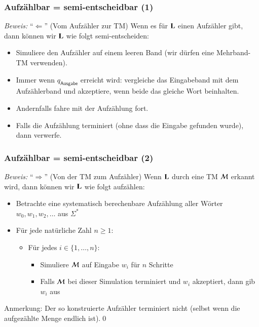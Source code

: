 \documentclass[onlymath]{beamer}
\begin{document}
\begin{frame}[t]\frametitle{Aufzählbar = semi-entscheidbar (1)}

\pause

\emph{Beweis:} "`$\Leftarrow$"' (Vom Aufzähler zur TM) Wenn es für $\textbf{\textcolor{black}{L}}$ einen Aufzähler
gibt, dann können wir $\textbf{\textcolor{black}{L}}$ wie folgt semi-entscheiden:
\begin{itemize}
\item Simuliere den Aufzähler auf einem leeren Band (wir dürfen eine Mehrband-TM verwenden).
\item Immer wenn $q_{\textsf{Ausgabe}}$ erreicht wird: vergleiche das Eingabeband mit dem Aufzählerband und akzeptiere, wenn beide das gleiche Wort beinhalten.
\item Andernfalls fahre mit der Aufzählung fort.
\item Falls die Aufzählung terminiert (ohne dass die Eingabe gefunden wurde), dann verwerfe.
\end{itemize}

\end{frame}

\begin{frame}[t]\frametitle{Aufzählbar = semi-entscheidbar (2)}

\pause

\emph{Beweis:} "`$\Rightarrow$"' (Von der TM zum Aufzähler) Wenn $\textbf{\textcolor{black}{L}}$ durch eine TM $\mathcal{M}$ erkannt wird, dann können wir $\textbf{\textcolor{black}{L}}$ wie folgt aufzählen:
\begin{itemize}
\item Betrachte eine systematisch berechenbare Aufzählung aller Wörter $w_0, w_1, w_2, \ldots$ aus $\Sigma^*$
\item Für jede natürliche Zahl $n\geq 1$:
	\begin{itemize}
	\item Für jedes $i\in\{1,\ldots, n\}$:
		\begin{itemize}
		\item Simuliere $\mathcal{M}$ auf Eingabe $w_i$ für $n$ Schritte
		\item Falls $\mathcal{M}$ bei dieser Simulation terminiert und $w_i$ akzeptiert, dann gib $w_i$ aus
		\end{itemize}
	\end{itemize}
\end{itemize}
Anmerkung: Der so konstruierte Aufzähler terminiert nicht (selbst wenn die aufgezählte Menge endlich ist).\qed

\end{frame}
\end{document}
